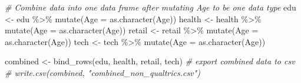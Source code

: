 \documentclass[
]{article}
\newenvironment{Shaded}{\begin{snugshade}}{\end{snugshade}}
\newcommand{\AttributeTok}[1]{\textcolor[rgb]{0.77,0.63,0.00}{#1}}
\newcommand{\CommentTok}[1]{\textcolor[rgb]{0.56,0.35,0.01}{\textit{#1}}}
\newcommand{\FunctionTok}[1]{\textcolor[rgb]{0.00,0.00,0.00}{#1}}
\newcommand{\NormalTok}[1]{#1}
\newcommand{\OtherTok}[1]{\textcolor[rgb]{0.56,0.35,0.01}{#1}}
\newcommand{\SpecialCharTok}[1]{\textcolor[rgb]{0.00,0.00,0.00}{#1}}
\begin{document}
\begin{Shaded}
\begin{Highlighting}[]
\CommentTok{\# Combine data into one data frame after mutating Age to be one data type}
\NormalTok{edu }\OtherTok{\textless{}{-}}\NormalTok{ edu }\SpecialCharTok{\%\textgreater{}\%} \FunctionTok{mutate}\NormalTok{(}\AttributeTok{Age =} \FunctionTok{as.character}\NormalTok{(Age))}
\NormalTok{health }\OtherTok{\textless{}{-}}\NormalTok{ health }\SpecialCharTok{\%\textgreater{}\%} \FunctionTok{mutate}\NormalTok{(}\AttributeTok{Age =} \FunctionTok{as.character}\NormalTok{(Age))}
\NormalTok{retail }\OtherTok{\textless{}{-}}\NormalTok{ retail }\SpecialCharTok{\%\textgreater{}\%} \FunctionTok{mutate}\NormalTok{(}\AttributeTok{Age =} \FunctionTok{as.character}\NormalTok{(Age))}
\NormalTok{tech }\OtherTok{\textless{}{-}}\NormalTok{ tech }\SpecialCharTok{\%\textgreater{}\%} \FunctionTok{mutate}\NormalTok{(}\AttributeTok{Age =} \FunctionTok{as.character}\NormalTok{(Age))}

\NormalTok{combined }\OtherTok{\textless{}{-}} \FunctionTok{bind\_rows}\NormalTok{(edu, health, retail, tech)}
\CommentTok{\# export combined data to csv}
\CommentTok{\# write.csv(combined, "combined\_non\_qualtrics.csv")}
\end{Highlighting}
\end{Shaded}
\end{document}
